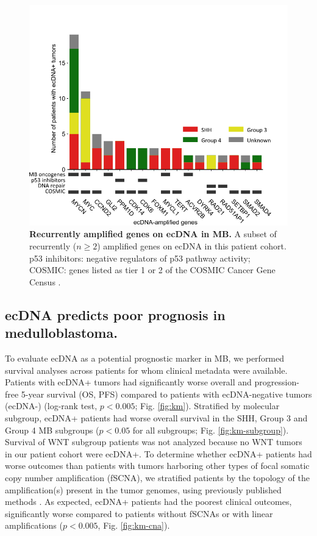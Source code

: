\begin{figure}[!h]
    \centering
    \includegraphics[]{figures/1-2.png}
    \caption[Recurrently amplified genes on ecDNA in MB.]{\textbf{Recurrently amplified genes on ecDNA in MB.} A subset of recurrently ($n \geq 2$) amplified genes on ecDNA in this patient cohort. p53 inhibitors: negative regulators of p53 pathway activity; COSMIC: genes listed as tier 1 or 2 of the COSMIC Cancer Gene Census \cite{cosmic}.}
    \label{fig:1b}
\end{figure}

\subsection{ecDNA predicts poor prognosis in medulloblastoma.}
To evaluate ecDNA as a potential prognostic marker in MB, we performed survival analyses across patients for whom clinical metadata were available. Patients with \gls{ecDNA+} tumors had significantly worse overall and progression-free 5-year survival (OS, PFS) compared to patients with ecDNA-negative tumors (ecDNA-) (log-rank test, $p < 0.005$; Fig. \ref{fig:km}). Stratified by molecular subgroup, ecDNA+ patients had worse overall survival in the SHH, Group 3 and Group 4 MB subgroups ($p<0.05$ for all subgroups; Fig. \ref{fig:km-subgroup}). Survival of WNT subgroup patients was not analyzed because no WNT tumors in our patient cohort were ecDNA+. To determine whether ecDNA+ patients had worse outcomes than patients with tumors harboring other types of focal somatic copy number amplification (fSCNA), we stratified patients by the topology of the amplification(s) present in the tumor genomes, using previously published methods \cite{Kim_2020}. As expected, ecDNA+ patients had the poorest clinical outcomes, significantly worse compared to patients without fSCNAs or with linear amplifications ($p<0.005$, Fig. \ref{fig:km-cna}). 

